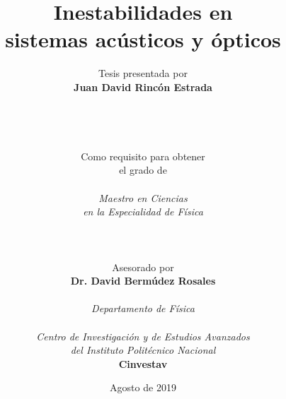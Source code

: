 \title{\textbf{Inestabilidades en\\
 sistemas ac\'{u}sticos y \'{o}pticos}}
\author{
Tesis presentada por\\
\textbf{Juan David Rinc\'{o}n Estrada}\\ \\ \\ \\ \\
Como requisito para obtener \\
el grado de\\ \\
\textit{Maestro en Ciencias}\\
\textit{en la Especialidad de F\'{i}sica}\\
\\ \\ \\
Asesorado por\\
\textbf{Dr. David Berm\'udez Rosales} \\ \\
\textit{Departamento de F\'{i}sica} \\ \\ 
\textit{Centro de Investigaci\'{o}n y de Estudios Avanzados} \\ 
\textit{del Instituto Polit\'{e}cnico Nacional} \\
\textbf{Cinvestav}
}
\date{Agosto de 2019} 
